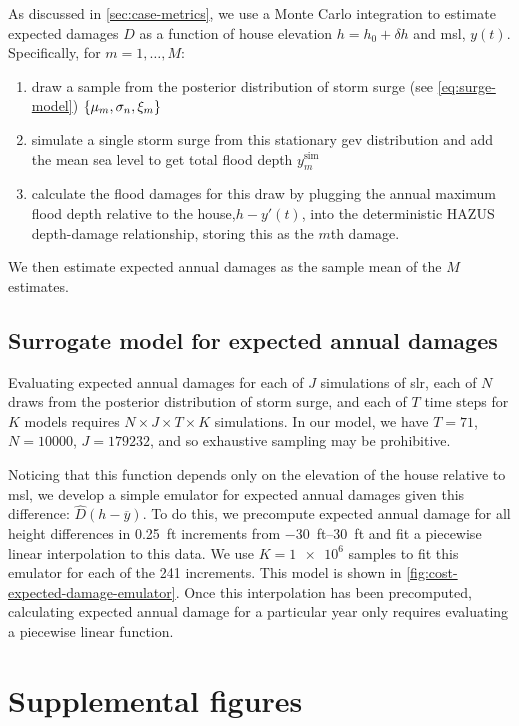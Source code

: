 \documentclass[11pt]{article}
\begin{document}
As discussed in \cref{sec:case-metrics}, we use a Monte Carlo integration to estimate expected damages $D$ as a function of house elevation $h = h_0 + \delta h$ and \gls{msl}, $y(t)$.
Specifically, for $m=1, \ldots, M$:
\begin{enumerate}
    \item draw a sample from the posterior distribution of storm surge (see \cref{eq:surge-model})  $\qty{ \mu_m, \sigma_n, \xi_m}$
    \item simulate a single storm surge from this stationary \gls{gev} distribution and add the mean sea level to get total flood depth $y^\mathrm{sim}_m$
    \item calculate the flood damages for this draw by plugging the annual maximum flood depth relative to the house,$h - y'(t)$, into  the deterministic HAZUS depth-damage relationship, storing this as the $m$th damage.
\end{enumerate}
We then estimate expected annual damages as the sample mean of the $M$ estimates.

\subsection{Surrogate model for expected annual damages}\label{sec:surrogate-ead}
Evaluating expected annual damages for each of $J$ simulations of \gls{slr}, each of $N$ draws from the posterior distribution of storm surge, and each of $T$ time steps for $K$ models requires $N \times J \times T \times K$ simulations.
In our model, we have $T=71$, $N=\num{10000}$, $J=\num{179232}$, and so exhaustive sampling may be prohibitive.

Noticing that this function depends only on the elevation of the house relative to \gls{msl}, we develop a simple emulator for expected annual damages given this difference: $\hat{D}(h - \overline{y})$.
To do this, we  precompute expected annual damage for all height differences in \SI{0.25}{ft} increments from \SIrange{-30}{30}{ft} and fit a piecewise linear interpolation to this data.
We use $K=\num{1e6}$ samples to fit this emulator for each of the 241 increments.
This model is shown in \cref{fig:cost-expected-damage-emulator}.
Once this interpolation has been precomputed, calculating expected annual damage for a particular year only requires evaluating a piecewise linear function.

\section{Supplemental figures}
\end{document}

